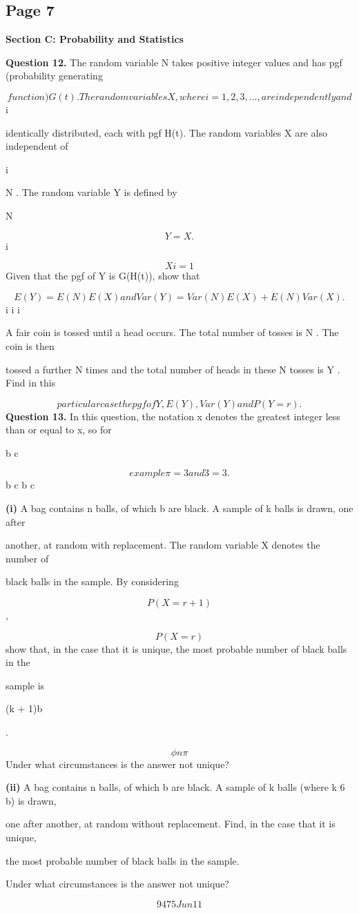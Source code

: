 \documentclass[12pt]{article}
\begin{document}
\subsection*{Page 7}
\begin{flushleft}
\bigskip\textbf{Section C: Probability and Statistics}\par
\bigskip\textbf{Question 12.} The random variable N takes positive integer values and has pgf (probability generating\par
\[function) G(t). The random variables X , where i = 1, 2, 3, . . . , are independently and\]
i\par
identically distributed, each with pgf H(t). The random variables X are also independent of\par
i\par
N . The random variable Y is defined by\par
N\par
\[Y = X .\]
i\par
\[Xi=1\]
Given that the pgf of Y is G(H(t)), show that\par
\[E(Y ) = E(N )E(X ) and Var (Y ) = Var (N ) E(X ) + E(N )Var (X ) .\]
i i i\par
A fair coin is tossed until a head occurs. The total number of tosses is N . The coin is then\par
tossed a further N times and the total number of heads in these N tosses is Y . Find in this\par
\[particular case the pgf of Y , E(Y ), Var (Y ) and P(Y = r).\]
\bigskip\textbf{Question 13.} In this question, the notation x denotes the greatest integer less than or equal to x, so for\par
b c\par
\[example \pi = 3 and 3 = 3.\]
b c b c\par
\textbf{(i)} A bag contains n balls, of which b are black. A sample of k balls is drawn, one after\par
another, at random with replacement. The random variable X denotes the number of\par
black balls in the sample. By considering\par
\[P(X = r + 1)\]
,\par
\[P(X = r)\]
show that, in the case that it is unique, the most probable number of black balls in the\par
sample is\par
(k + 1)b\par
.\par
\[\phi n \pi\]
Under what circumstances is the answer not unique?\par
\textbf{(ii)} A bag contains n balls, of which b are black. A sample of k balls (where k 6 b) is drawn,\par
one after another, at random without replacement. Find, in the case that it is unique,\par
the most probable number of black balls in the sample.\par
Under what circumstances is the answer not unique?\par
\[9475 Jun11\]
\end{flushleft}
\end{document}
